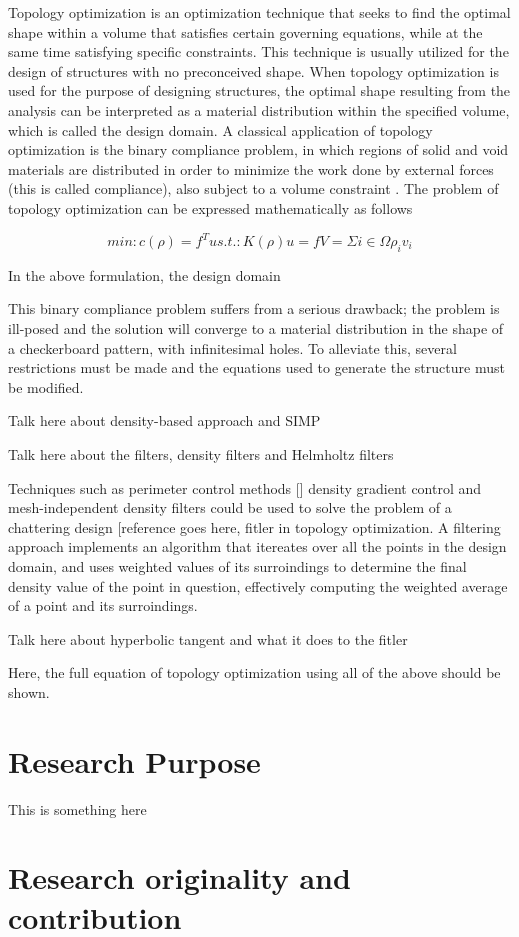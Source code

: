 \documentclass[../main.tex]{subfiles}
\begin{document}
Topology optimization is an optimization technique that seeks to find the optimal shape within a volume that satisfies certain governing equations, while at the same time satisfying specific constraints. This technique is usually utilized for the design of structures with no preconceived shape. When topology optimization is used for the purpose of designing structures, the optimal shape resulting from the analysis can be interpreted as a material distribution within the specified volume, which is called the design domain. A classical application of topology optimization is the binary compliance problem, in which regions of solid and void materials are distributed in order to minimize the work done by external forces (this is called compliance), also subject to a volume constraint \cite{liuEfficient3DTopology2014}. The problem of topology optimization can be expressed mathematically as follows \cite{lazarovFiltersTopologyOptimization2011}

\begin{equation}
  \label{eq:topopt_eq}
  min: c(\rho) = f^T u 
  s.t. : K(\rho)u = f 
  V = \Sigma i \in \Omega \rho_i v_i
\end{equation}

In the above formulation, the design domain 

This binary compliance problem suffers from a serious drawback; the problem is ill-posed and the solution will converge to a material distribution in the shape of a checkerboard pattern, with infinitesimal holes. To alleviate this, several restrictions must be made  and the equations used to generate the structure must be modified. 

Talk here about density-based approach and SIMP 

Talk here about the filters, density filters and Helmholtz filters

Techniques such as perimeter control methods [] density gradient control 
and mesh-independent density filters could be used to solve the problem of a chattering design [reference goes here, fitler in topology optimization. A filtering approach implements an algorithm that itereates over all the points in the design domain, and uses weighted values of its surroindings to determine the final density value of the point in question, effectively computing the weighted average of a point and its surroindings.

Talk here about hyperbolic tangent and what it does to the fitler

Here, the full equation of topology optimization using all of the above should be shown.

\section{Research Purpose}
 
This is something here

\section{Research originality and contribution}
\end{document}
